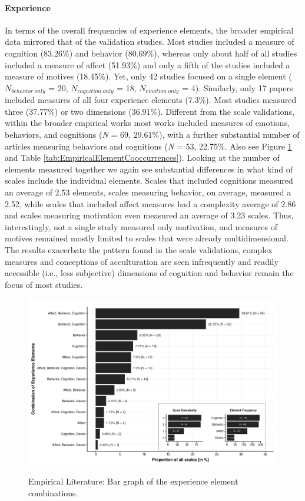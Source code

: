 \paragraph{Experience}

In terms of the overall frequencies of experience elements, the broader
empirical data mirrored that of the validation studies. Most studies
included a measure of cognition (83.26\%) and behavior (80.69\%),
whereas only about half of all studies included a measure of affect
(51.93\%) and only a fifth of the studies included a measure of motives
(18.45\%). Yet, only 42 studies focused on a single element
(\(N_{behavior\ only}\) = 20, \(N_{cognition\ only}\) = 18,
\(N_{emotion\ only}\) = 4). Similarly, only 17 papers included measures
of all four experience elements (7.3\%). Most studies measured three
(37.77\%) or two dimensions (36.91\%). Different from the scale
validations, within the broader empirical works most works included
measures of emotions, behaviors, and cognitions (\textit{N} = 69,
29.61\%), with a further substantial number of articles measuring
behaviors and cognitions (\textit{N} = 53, 22.75\%. Also see Figure
\ref{fig:EmpPlotFreq-1} and Table
\ref{tab:EmpiricalElementCooccurrences}). Looking at the number of
elements measured together we again see substantial differences in what
kind of scales include the individual elements. Scales that included
cognitions measured an average of 2.53 elements, scales measuring
behavior, on average, measured a 2.52, while scales that included affect
measures had a complexity average of 2.86 and scales measuring
motivation even measured an average of 3.23 scales. Thus, interestingly,
not a single study measured only motivation, and measures of motives
remained mostly limited to scales that were already multidimensional.
The results exacerbate the pattern found in the scale validations,
complex measures and conceptions of acculturation are seen infrequently
and readily accessible (i.e., less subjective) dimensions of cognition
and behavior remain the focus of most studies.

\begin{figure}[h]
\centering
\caption{Empirical Literature: Bar graph of the experience element combinations.}
\includegraphics[width=\textwidth]{Figures/EmpPlotFreq-1}
\label{fig:EmpPlotFreq-1}
\end{figure}

